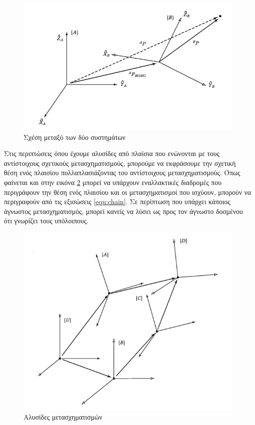 \begin{figure}[H]
    \centering
    \includegraphics[width=.7\textwidth, keepaspectratio]{fig/transofrmation.png}
    \caption{Σχέση μεταξύ των δύο συστημάτων \cite{craig95}}
    \label{fig:transformation}
\end{figure}

Στις περιπτώσεις όπου έχουμε αλυσίδες από πλαίσια που ενώνονται με τους αντίστοιχους σχετικούς μετασχηματισμούς, μπορούμε να εκφράσουμε την σχετική θέση ενός πλαισίου πολλαπλασιάζοντας του αντίστοιχους μετασχηματισμούς. Όπως φαίνεται και στην εικόνα \ref{fig:transformation-chain} μπορεί να υπάρχουν εναλλακτικές διαδρομές που περιγράφουν την θέση ενός πλαισίου και οι μετασχηματισμοί που ισχύουν, μπορούν να περιγραφούν από τις εξισώσεις \ref{equ:chain}. Σε περίπτωση που υπάρχει κάποιος άγνωστος μετασχηματισμός, μπορεί κανείς να λύσει ως προς τον άγνωστο δοσμένου ότι γνωρίζει τους υπόλοιπους.

\begin{figure}[H]
    \centering
    \includegraphics[width=.7\textwidth, height=.4\textheight, keepaspectratio]{fig/transformation-chain.png}
    \caption{Αλυσίδες μετασχηματισμών \cite{craig95}}
    \label{fig:transformation-chain}
\end{figure}


